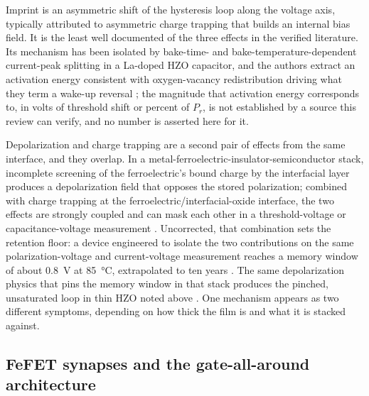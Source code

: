 Imprint is an asymmetric shift of the hysteresis loop along the voltage axis, typically
attributed to asymmetric charge trapping that builds an internal bias field. It is the
least well documented of the three effects in the verified literature. Its mechanism has
been isolated by
bake-time- and bake-temperature-dependent current-peak splitting in a La-doped HZO
capacitor, and the authors extract an activation energy consistent with oxygen-vacancy
redistribution driving what they term a wake-up reversal \cite{Lee2023_IEEETED}; the
magnitude that activation energy corresponds to, in volts of threshold shift or percent of
$P_r$, is not established by a source this review can verify, and no number is asserted
here for it.

Depolarization and charge trapping are a second pair of effects from the same
interface, and they overlap. In a metal-ferroelectric-insulator-semiconductor stack,
incomplete screening
of the ferroelectric's bound charge by the interfacial layer produces a depolarization
field that opposes the stored polarization; combined with charge trapping at the
ferroelectric/interfacial-oxide interface, the two effects are strongly coupled and can
mask each other in a threshold-voltage or capacitance-voltage measurement
\cite{Toprasertpong2022_ApplPhysA}. Uncorrected, that combination sets the
retention floor: a device engineered to isolate the two contributions on the same
polarization-voltage and current-voltage measurement reaches a memory window of about
\SI{0.8}{\volt} at \SI{85}{\celsius}, extrapolated to ten years
\cite{Higashi2021_IEEETED}. The same depolarization physics that pins the memory window
in that stack produces the pinched, unsaturated loop in thin HZO noted above
\cite{Siannas2022_CommPhys}. One mechanism appears as two different symptoms,
depending on how thick the film is and what it is stacked against.

\subsection{FeFET synapses and the gate-all-around architecture}
\label{sec:lit:gaa}


